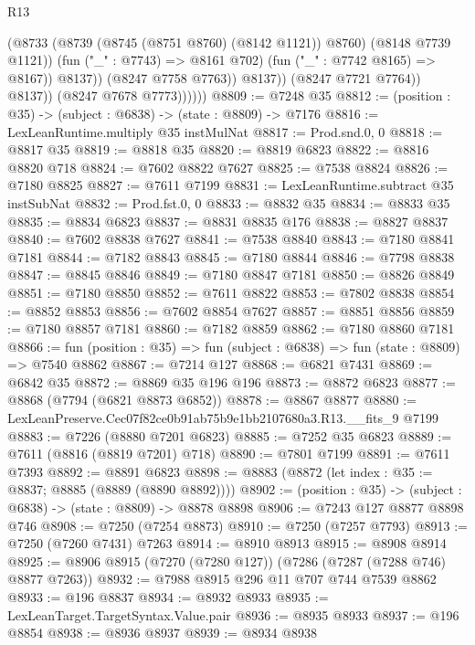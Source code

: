 \begin{lexlean}{R13}
\begin{coremodule}
                                (@8733
                                  (@8739 (@8745 (@8751 @8760) (@8142 @1121)) @8760)
                                  (@8148 @7739 @1121))
                                (fun ("_" : @7743) => @8161 @702)
                                (fun ("_" : @7742 @8165) => @8167))
                              @8137))
                          (@8247 @7758 @7763))
                        @8137))
                    (@8247 @7721 @7764))
                  @8137))
              (@8247 @7678 @7773))))))
@8809 := @7248 @35
@8812 := (position : @35) -> (subject : @6838) -> (state : @8809) -> @7176
@8816 := LexLeanRuntime.multiply @35 instMulNat
@8817 := Prod.snd.{0, 0}
@8818 := @8817 @35
@8819 := @8818 @35
@8820 := @8819 @6823
@8822 := @8816 @8820 @718
@8824 := @7602 @8822 @7627
@8825 := @7538 @8824
@8826 := @7180 @8825
@8827 := @7611 @7199
@8831 := LexLeanRuntime.subtract @35 instSubNat
@8832 := Prod.fst.{0, 0}
@8833 := @8832 @35
@8834 := @8833 @35
@8835 := @8834 @6823
@8837 := @8831 @8835 @176
@8838 := @8827 @8837
@8840 := @7602 @8838 @7627
@8841 := @7538 @8840
@8843 := @7180 @8841 @7181
@8844 := @7182 @8843
@8845 := @7180 @8844
@8846 := @7798 @8838
@8847 := @8845 @8846
@8849 := @7180 @8847 @7181
@8850 := @8826 @8849
@8851 := @7180 @8850
@8852 := @7611 @8822
@8853 := @7802 @8838
@8854 := @8852 @8853
@8856 := @7602 @8854 @7627
@8857 := @8851 @8856
@8859 := @7180 @8857 @7181
@8860 := @7182 @8859
@8862 := @7180 @8860 @7181
@8866 := fun (position : @35) => fun (subject : @6838) => fun (state : @8809) => @7540 @8862
@8867 := @7214 @127
@8868 := @6821 @7431
@8869 := @6842 @35
@8872 := @8869 @35 @196 @196
@8873 := @8872 @6823
@8877 := @8868 (@7794 (@6821 @8873 @6852))
@8878 := @8867 @8877
@8880 := LexLeanPreserve.Cec07f82ce0b91ab75b9e1bb2107680a3.R13.__fits_9 @7199
@8883 := @7226 (@8880 @7201 @6823)
@8885 := @7252 @35 @6823
@8889 := @7611 (@8816 (@8819 @7201) @718)
@8890 := @7801 @7199
@8891 := @7611 @7393
@8892 := @8891 @6823
@8898 := @8883 (@8872 (let index : @35 := @8837; @8885 (@8889 (@8890 @8892))))
@8902 := (position : @35) -> (subject : @6838) -> (state : @8809) -> @8878 @8898
@8906 := @7243 @127 @8877 @8898 @746
@8908 := @7250 (@7254 @8873)
@8910 := @7250 (@7257 @7793)
@8913 := @7250 (@7260 @7431) @7263
@8914 := @8910 @8913
@8915 := @8908 @8914
@8925 := @8906 @8915 (@7270 (@7280 @127)) (@7286 (@7287 (@7288 @746) @8877 @7263))
@8932 := @7988 @8915 @296 @11 @707 @744 @7539 @8862
@8933 := @196 @8837
@8934 := @8932 @8933
@8935 := LexLeanTarget.TargetSyntax.Value.pair
@8936 := @8935 @8933
@8937 := @196 @8854
@8938 := @8936 @8937
@8939 := @8934 @8938

\end{coremodule}
\end{lexlean}
